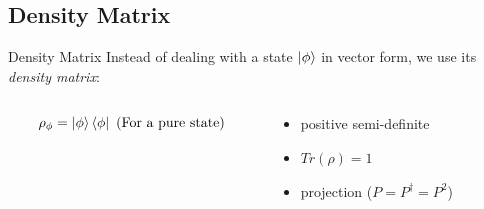 \documentclass[11pt,svgnames,smaller,aspectratio=43,english]{beamer}
\begin{document}
\subsection{Density Matrix}
\begin{frame}{Density Matrix}
	Instead of dealing with a state $\ket{\phi}$ in vector form, we use its \emph{density matrix}:

	\begin{columns}
		\begin{column}[T]{0.35\textwidth}
			\begin{equation*}
				\rho_\phi = \ket{\phi}\bra{\phi} \text{ (For a pure state)}		
			\end{equation*}
		\end{column}
		\begin{column}[T]{0.5\textwidth}
			\begin{itemize}
				\item positive semi-definite
				\item $Tr(\rho) = 1$
				\item projection ($P = P^\dagger = P^2$)
			\end{itemize}
		\end{column}
	\end{columns}

	\vspace*{1em}

	
\end{frame}
\end{document}
